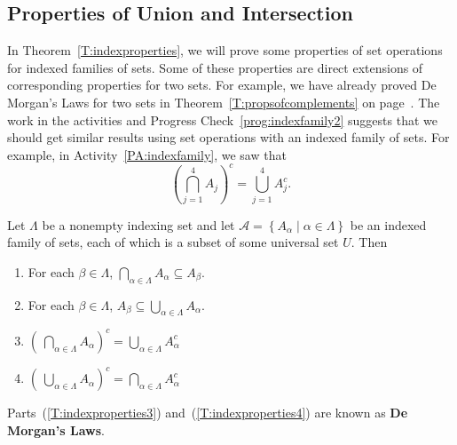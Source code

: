 \subsection*{Properties of Union and Intersection}
In Theorem~\ref{T:indexproperties}, we will prove some properties of set operations for indexed families of sets.  Some of these properties are direct extensions of corresponding properties for two sets.  For example, we have already proved De Morgan's Laws for two sets in 
Theorem~\ref{T:propsofcomplements} on page~\pageref{T:propsofcomplements}.  The work in the \typel activities and Progress Check~\ref{prog:indexfamily2} suggests that we should get similar results using set operations with an indexed family of sets.  For example, in \typeu Activity~\ref*{PA:indexfamily}, we saw that
\[
\left( \bigcap_{j=1}^{4}A_j \right)^c = \bigcup_{j=1}^{4}A_j^c.
\]

\begin{theorem} \label{T:indexproperties}
Let $\Lambda$ be a nonempty indexing set and let 
$\mathscr{A} = \left\{ A_\alpha \mid \alpha \in \Lambda \right\}$ be an indexed family of sets, each of which is a subset of some universal set $U$.  Then
\begin{enumerate}
\item For each $\beta \in \Lambda$, $\bigcap\limits_{\alpha \in \Lambda}^{}A_\alpha \subseteq A_\beta$. \label{T:indexproperties1}
\item For each $\beta \in \Lambda$, $A_\beta \subseteq \bigcup\limits_{\alpha \in \Lambda}^{}A_\alpha$. \label{T:indexproperties2}
\item $\left(\:\bigcap\limits_{\alpha \in \Lambda}^{}A_\alpha \right)^c = 
\bigcup\limits_{\alpha \in \Lambda}^{}A_{\alpha}^c$ \label{T:indexproperties3}
\item $\left(\:\bigcup\limits_{\alpha \in \Lambda}^{}A_\alpha \right)^c = 
\bigcap\limits_{\alpha \in \Lambda}^{}A_{\alpha}^c$ \label{T:indexproperties4}
\end{enumerate}
Parts~(\ref{T:indexproperties3}) and~(\ref{T:indexproperties4}) are known as 
\textbf{De Morgan's Laws}.
%
%
\end{theorem}

